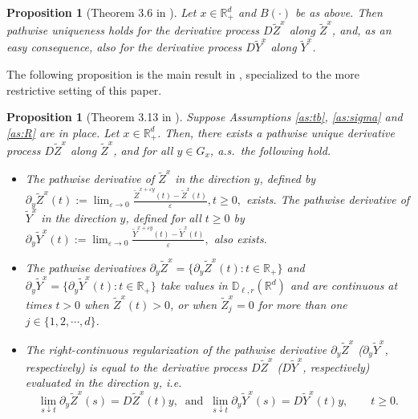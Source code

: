 \documentclass[11pt]{article}
\theoremstyle{definition}
\theoremstyle{plain}
\newtheorem{proposition}[assumption]{Proposition}
\newcommand{\D}{\mathbb{D}}
\begin{document}
\begin{proposition}[Theorem 3.6 in \cite{LipshutzRamanan2019b}]\label{prop:deriv-unique}
Let $x \in \mathbb{R}_+^d$ and $B(\cdot)$ be as above. Then pathwise uniqueness holds for the derivative process $D\tilde Z^x$ along $\tilde Z^x$, 
and, as an easy consequence, also for the derivative process $D\tilde Y^x$ along $\tilde Y^x$.
\end{proposition}
The following proposition is the main result in \textsc{\cite{LipshutzRamanan2019b}}, specialized to the more restrictive setting of this paper.
\begin{proposition}[Theorem 3.13 in \cite{LipshutzRamanan2019b}]\label{prop:LR2019b-main}
Suppose  Assumptions \ref{as:tb}, \ref{as:sigma} and \ref{as:R} are in place.
Let $x \in \mathbb{R}_+^d$. Then, there exists a pathwise unique derivative process $D\tilde Z^x$ along $\tilde Z^x$, and for all $y \in G_x$, a.s.\ the following hold.
\begin{itemize}
\item[(i)] The pathwise derivative of $\tilde Z^x$ in the direction $y$, defined by
\(
\partial_y \tilde Z^x(t) := \lim_{\varepsilon \to 0} \frac{\tilde Z^{x + \varepsilon y}(t) - \tilde Z^x(t)}{\varepsilon}, t\ge 0,
\)
exists. The pathwise derivative of $\tilde Y^x$ in the direction $y$, defined for all $t \ge 0$ by
\(
\partial_y \tilde Y^x(t) := \lim_{\varepsilon \to 0} \frac{\tilde Y^{x + \varepsilon y}(t) - \tilde Y^x(t)}{\varepsilon},
\)
also exists.
\item[(ii)] The pathwise derivatives $\partial_y \tilde Z^x = \{\partial_y \tilde Z^x(t) : t \in \mathbb{R}_+\}$ and 
$\partial_y \tilde Y^x = \{\partial_y \tilde Y^x(t) : t \in \mathbb{R}_+\}$ take values in $\D_{\ell, r}(\mathbb{R}^d)$ and are continuous at times $t > 0$ when $\tilde Z^x(t) > 0$, or when $\tilde Z^x_j = 0$ for more than one $j \in \{1, 2, \cdots, d\}$.

\item[(iii)] The right-continuous regularization of the pathwise derivative $\partial_y \tilde Z^x$ ($\partial_y \tilde Y^x$, respectively) is equal to the derivative process $D\tilde Z^x$ 
($D\tilde Y^x$, respectively) evaluated in the direction $y$, i.e.
\[
\lim_{s \downarrow t} \partial_y \tilde Z^x(s) = D\tilde Z^x(t) y, \ \text{ and } \ \lim_{s \downarrow t} \partial_y \tilde Y^x(s) = D\tilde Y^x(t) y, \qquad t \geq 0. 
\]
\end{itemize}
\end{proposition}
\end{document}
